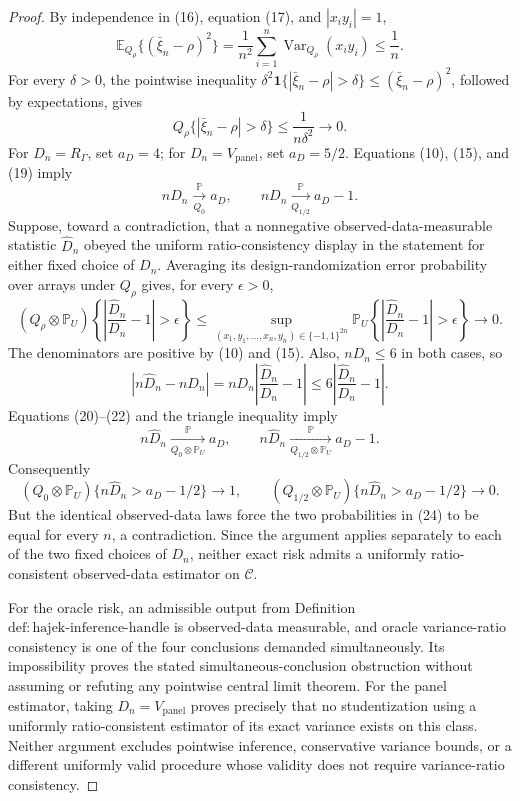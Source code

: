 \documentclass{article}
\begin{document}
\begin{proof}
By independence in (16), equation (17), and \(|x_i y_i|=1\),
\[
\mathbb E_{Q_\rho}\{(\bar\xi_n-\rho)^2\}
=\frac1{n^2}\sum_{i=1}^n\operatorname{Var}_{Q_\rho}(x_i y_i)
\le\frac1n.
\tag{18}
\]
For every \(\delta>0\), the pointwise inequality \(\delta^2\mathbf 1\{|\bar\xi_n-\rho|>\delta\}\le(\bar\xi_n-\rho)^2\), followed by expectations, gives
\[
Q_\rho\{|\bar\xi_n-\rho|>\delta\}
\le\frac1{n\delta^2}\longrightarrow0.
\tag{19}
\]
For \(D_n=R_\Gamma\), set \(a_D=4\); for \(D_n=V_{\mathrm{panel}}\), set \(a_D=5/2\).  Equations (10), (15), and (19) imply
\[
nD_n\xrightarrow[Q_0]{\mathbb P}a_D,
\qquad
nD_n\xrightarrow[Q_{1/2}]{\mathbb P}a_D-1.
\tag{20}
\]
Suppose, toward a contradiction, that a nonnegative observed-data-measurable statistic \(\widehat D_n\) obeyed the uniform ratio-consistency display in the statement for either fixed choice of \(D_n\).  Averaging its design-randomization error probability over arrays under \(Q_\rho\) gives, for every \(\epsilon>0\),
\[
(Q_\rho\otimes\mathbb P_U)
\!\left\{\left|\frac{\widehat D_n}{D_n}-1\right|>\epsilon\right\}
\le
\sup_{(x_1,y_1,\ldots,x_n,y_n)\in\{-1,1\}^{2n}}
\mathbb P_U
\!\left\{\left|\frac{\widehat D_n}{D_n}-1\right|>\epsilon\right\}
\longrightarrow0.
\tag{21}
\]
The denominators are positive by (10) and (15).  Also, \(nD_n\le6\) in both cases, so
\[
|n\widehat D_n-nD_n|
=nD_n\left|\frac{\widehat D_n}{D_n}-1\right|
\le6\left|\frac{\widehat D_n}{D_n}-1\right|.
\tag{22}
\]
Equations (20)--(22) and the triangle inequality imply
\[
n\widehat D_n\xrightarrow[Q_0\otimes\mathbb P_U]{\mathbb P}a_D,
\qquad
n\widehat D_n\xrightarrow[Q_{1/2}\otimes\mathbb P_U]{\mathbb P}a_D-1.
\tag{23}
\]
Consequently
\[
(Q_0\otimes\mathbb P_U)\{n\widehat D_n>a_D-1/2\}\longrightarrow1,
\qquad
(Q_{1/2}\otimes\mathbb P_U)\{n\widehat D_n>a_D-1/2\}\longrightarrow0.
\tag{24}
\]
But the identical observed-data laws force the two probabilities in (24) to be equal for every \(n\), a contradiction.  Since the argument applies separately to each of the two fixed choices of \(D_n\), neither exact risk admits a uniformly ratio-consistent observed-data estimator on \(\mathcal C\).

For the oracle risk, an admissible output from Definition \(\mathrm{def:hajek\text{-}inference\text{-}handle}\) is observed-data measurable, and oracle variance-ratio consistency is one of the four conclusions demanded simultaneously.  Its impossibility proves the stated simultaneous-conclusion obstruction without assuming or refuting any pointwise central limit theorem.  For the panel estimator, taking \(D_n=V_{\mathrm{panel}}\) proves precisely that no studentization using a uniformly ratio-consistent estimator of its exact variance exists on this class.  Neither argument excludes pointwise inference, conservative variance bounds, or a different uniformly valid procedure whose validity does not require variance-ratio consistency.


\end{proof}
\end{document}
